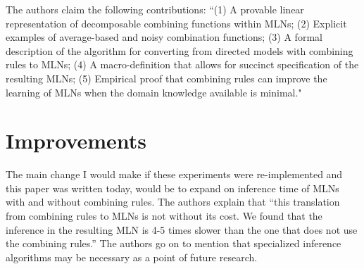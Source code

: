 \documentclass[letterpaper]{article}
\begin{document}
The authors claim the following contributions: ``(1) A provable linear representation of decomposable combining functions within MLNs; (2) Explicit examples of average-based and noisy combination functions; (3) A formal description of the algorithm for converting from directed models with combining rules to MLNs; (4) A macro-definition that allows for succinct specification of the resulting MLNs; (5) Empirical proof that combining rules can improve the learning of MLNs when the domain knowledge available is minimal."

\section{Improvements}

The main change I would make if these experiments were re-implemented and this paper was written today, would be to expand on inference time of MLNs with and without combining rules. The authors explain that ``this translation from combining rules to MLNs is not without its cost. We found that the inference in the resulting MLN is 4-5 times slower than the one that does not use the combining rules.'' The authors go on to mention that specialized inference algorithms may be necessary as a point of future research.
\end{document}
